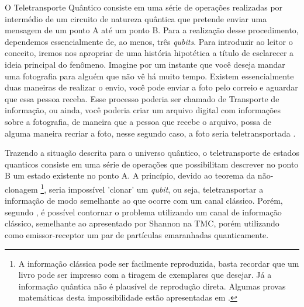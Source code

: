 \documentclass[11pt,oneside,brazil,hidelinks,article,sumario=tradicional,a4paper]{abntex2}
\begin{document}
O Teletransporte Quântico consiste em uma série de operações realizadas por intermédio de um circuito de natureza quântica que pretende enviar uma mensagem de um ponto A até um ponto B. Para a realização desse procedimento, dependemos essencialmente de, ao menos, três \textit{qubits}. Para introduzir ao leitor o conceito, iremos nos apropriar de uma história hipotética a título de esclarecer a ideia principal do fenômeno. Imagine por um instante que você deseja mandar uma fotografia para alguém que não vê há muito tempo. Existem essencialmente duas maneiras de realizar o envio, você pode enviar a foto pelo correio e aguardar que essa pessoa receba. Esse processo poderia ser chamado de Transporte de informação, ou ainda, você poderia criar um arquivo digital com informações sobre a fotografia, de maneira que a pessoa que recebe o arquivo, possa de alguma maneira recriar a foto, nesse segundo caso, a foto seria teletransportada \cite{materialdidaticomecquantica}.

Trazendo a situação descrita para o universo quântico, o teletransporte de estados quanticos consiste em uma série de operações que possibilitam descrever no ponto B um estado existente no ponto A. A princípio, devido ao teorema da não-clonagem \footnote{A informação clássica pode ser facilmente reproduzida, basta recordar que um livro pode ser impresso com a tiragem de exemplares que desejar. Já a informação quântica não é plausível de reprodução direta. Algumas provas matemáticas desta impossibilidade estão apresentadas em \textcite{TeoQuanInfoEntreCopia}.}, seria impossível 'clonar' um \textit{qubit}, ou seja, teletransportar a informação de modo semelhante ao que ocorre com um canal clássico. Porém, segundo \textcite{bennet}, é possível contornar o problema utilizando um canal de informação clássico, semelhante ao apresentado por Shannon na TMC, porém utilizando como emissor-receptor um par de partículas emaranhadas quanticamente.
\end{document}
